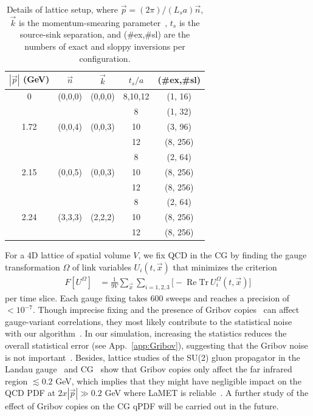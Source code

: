 \documentclass[prd,twocolumn,preprintnumbers,showpacs,nofootinbib,superscriptaddress,notitlepage,floatfix]{revtex4-1}
\DeclareMathOperator\re{Re}
\DeclareRobustCommand{\app}[1]{App.~\ref{app:#1}}
\newcommand{\Tr}{\mathrm{Tr}}
\begin{document}
\begin{table}
\centering
\begin{tabular}{c|c|c|c|c}
\hline
\hline
$|\vec{p}|$ (GeV)&$\vec{n}$ & $\vec{k}$ & $t_s/a$ & (\#ex,\#sl) \\
\hline
 0   &(0,0,0) & (0,0,0) & 8,10,12 & (1, 16) \\
\hline
     && & 8       & (1, 32) \\
 1.72&(0,0,4) & (0,0,3) & 10      & (3, 96) \\
     && & 12      & (8, 256) \\
\hline
     && & 8       & (2, 64) \\
 2.15&(0,0,5) & (0,0,3) & 10      & (8, 256) \\
     && & 12      & (8, 256) \\
 \hline
     & &  & 8       & (2, 64) \\
 2.24&(3,3,3) & (2,2,2) & 10      & (8, 256) \\
     && & 12      & (8, 256) \\
\hline
\hline
\end{tabular}
\caption{Details of lattice setup, where $\vec{p}=(2\pi)/(L_sa)\vec{n}$, $\vec{k}$ is the momentum-smearing parameter~\cite{Bali:2016lva}, $t_s$ is the source-sink separation, and (\#ex,\#sl) are the numbers of exact and sloppy inversions per configuration.}
\label{tbl:setup}
\end{table}

For a 4D lattice of spatial volume $V$, we fix QCD in the CG by finding the gauge transformation $\Omega$ of link variables $U_i(t,\vec{x})$ that minimizes the criterion~\cite{Davies:1987vs,Hudspith:2014oja}
\begin{align}
\label{eq:gribov}
  F[U^\Omega]
 & = \frac{1}{9V} \sum_{\vec{x}} \sum_{i=1,2,3} \big[-\re\Tr\ U^\Omega_i(t,\vec{x})\big]
\end{align}
per time slice. Each gauge fixing takes 600 sweeps and reaches a precision of $<\!10^{-7}$. Though imprecise fixing and the presence of Gribov copies~\cite{Gribov:1977wm,Singer:1978dk} can affect gauge-variant correlations, they most likely contribute to the statistical noise with our algorithm~\cite{Giusti:2001xf}. In our simulation, increasing the statistics reduces the overall statistical error (see \app{Gribov}), suggesting that the Gribov noise is not important~\cite{Burgio:2012ph}. Besides, lattice studies of the SU(2) gluon propagator in the Landau gauge~\cite{Maas:2017csm} and CG~\cite{Burgio:2016nad} show that Gribov copies only affect the far infrared region $\lesssim 0.2$ GeV, which implies that they might have negligible impact on the QCD PDF at $2x|\vec{p}|\gg 0.2$ GeV where LaMET is reliable~\cite{Zhang:2023bxs}.
A further study of the effect of Gribov copies on the CG qPDF will be carried out in the future.
\end{document}
